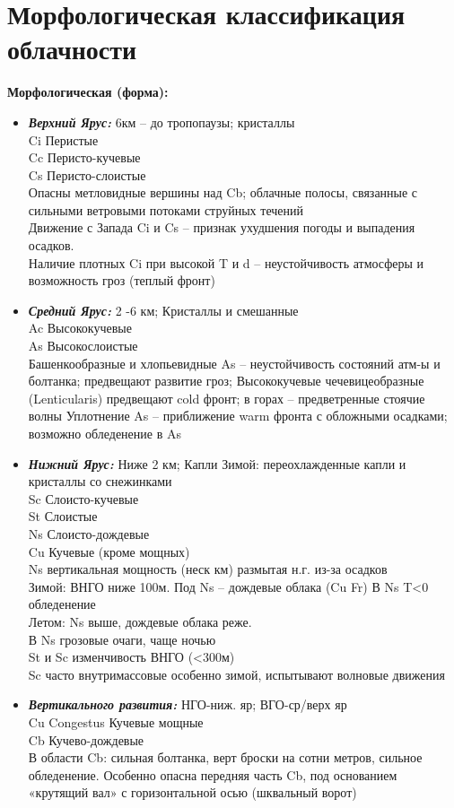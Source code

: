 
\section{Морфологическая классификация облачности}
\textbf{Морфологическая (форма):}
\begin{itemize}
	\item \textit{\textbf{Верхний Ярус:}} 6км – до тропопаузы; кристаллы\\
	Ci Перистые \\
	Cc Перисто-кучевые \\
	Cs Перисто-слоистые \\
	Опасны метловидные вершины над Cb; облачные полосы, связанные с сильными ветровыми потоками струйных течений\\
	Движение  с Запада Ci и Cs – признак ухудшения погоды и выпадения осадков.\\
	Наличие плотных Ci при высокой T и d – неустойчивость атмосферы и возможность гроз (теплый фронт)
	
	\item \textbf{\textit{Средний Ярус:}} 2 -6 км; Кристаллы и смешанные\\
	Ac Высококучевые\\
	As Высокослоистые\\
	Башенкообразные и хлопьевидные As – неустойчивость состояний атм-ы и болтанка; предвещают развитие гроз;
	Высококучевые чечевицеобразные (Lenticularis) предвещают cold фронт; в горах – предветренные стоячие волны
	Уплотнение As – приближение  warm фронта с обложными осадками; возможно обледенение в As
	
	\item \textbf{\textit{Нижний Ярус:}} Ниже 2 км; Капли Зимой: переохлажденные капли и кристаллы со снежинками\\
	Sc Слоисто-кучевые\\
	St  Слоистые\\
	Ns Слоисто-дождевые\\
	Cu Кучевые (кроме мощных)\\
	Ns вертикальная мощность (неск км) размытая н.г. из-за осадков\\
	Зимой: ВНГО ниже 100м. Под Ns – дождевые облака (Cu Fr) {\hspace{1cm} В Ns T<0 обледенение}\\
	Летом: Ns выше, дождевые облака реже.\\
	В Ns грозовые очаги, чаще ночью\\
	St и Sc изменчивость ВНГО (<300м)\\
	Sc часто внутримассовые особенно зимой, испытывают волновые движения
	
	\item \textbf{\textit{Вертикального развития:}} НГО-ниж. яр; ВГО-ср/верх яр\\
	Cu Congestus Кучевые мощные\\
	Cb Кучево-дождевые\\
	В области Cb: сильная болтанка, верт броски на сотни метров, сильное обледенение. Особенно опасна передняя часть Cb, под основанием «крутящий вал» с горизонтальной осью (шквальный ворот)
\end{itemize}